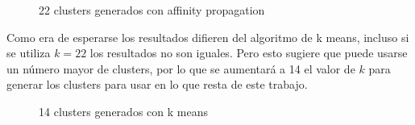 \documentclass[12pt,spanish]{article}
\begin{document}
	\begin{figure}[H]%
		\centering
		\qquad
		\caption{22 clusters generados con affinity propagation}%
		\label{fig:example}%
	\end{figure}
	Como era de esperarse los resultados difieren del algoritmo de k means, incluso si se utiliza $k=22$ los resultados no son iguales. Pero esto sugiere que puede usarse un número mayor de clusters, por lo que se aumentará a 14 el valor de $k$ para generar los clusters para usar en lo que resta de este trabajo.
	\begin{figure}[H]%
		\centering
		\qquad
		\caption{14 clusters generados con k means}%
		\label{fig:example}%
	\end{figure}
	\newpage
\end{document}

